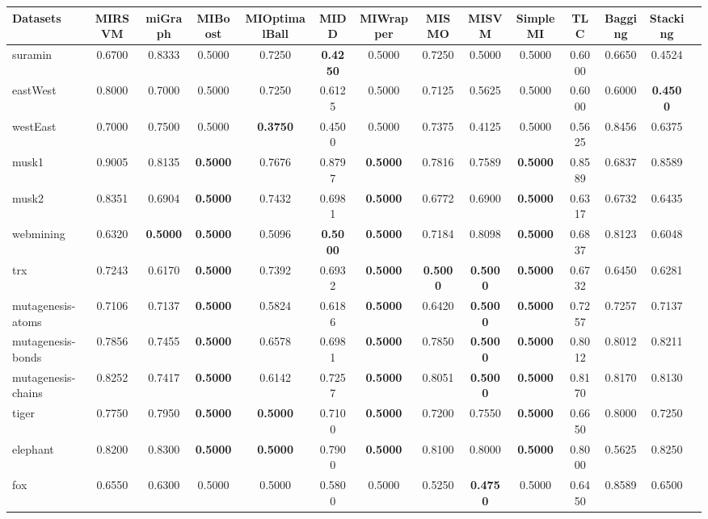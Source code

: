 \begin{threeparttable}
\begin{tabular}{lccccccccccccc}
\toprule
Datasets &MIRSVM &miGraph &MIBoost &MIOptimalBall &MIDD &MIWrapper &MISMO &MISVM &SimpleMI &TLC &Bagging &Stacking \\
\midrule
suramin &0.6700 &0.8333 &0.5000 &0.7250 &\textbf{0.4250} &0.5000 &0.7250 &0.5000 &0.5000 &0.6000 &0.6650 &0.4524 &  \\
eastWest &0.8000 &0.7000 &0.5000 &0.7250 &0.6125 &0.5000 &0.7125 &0.5625 &0.5000 &0.6000 &0.6000 &\textbf{0.4500} &  \\
westEast &0.7000 &0.7500 &0.5000 &\textbf{0.3750} &0.4500 &0.5000 &0.7375 &0.4125 &0.5000 &0.5625 &0.8456 &0.6375 &  \\
musk1 &0.9005 &0.8135 &\textbf{0.5000} &0.7676 &0.8797 &\textbf{0.5000} &0.7816 &0.7589 &\textbf{0.5000} &0.8589 &0.6837 &0.8589 &  \\
musk2 &0.8351 &0.6904 &\textbf{0.5000} &0.7432 &0.6981 &\textbf{0.5000} &0.6772 &0.6900 &\textbf{0.5000} &0.6317 &0.6732 &0.6435 &  \\
webmining &0.6320 &\textbf{0.5000} &\textbf{0.5000} &0.5096 &\textbf{0.5000} &\textbf{0.5000} &0.7184 &0.8098 &\textbf{0.5000} &0.6837 &0.8123 &0.6048 &  \\
trx &0.7243 &0.6170 &\textbf{0.5000} &0.7392 &0.6932 &\textbf{0.5000} &\textbf{0.5000} &\textbf{0.5000} &\textbf{0.5000} &0.6732 &0.6450 &0.6281 &  \\
mutagenesis-atoms &0.7106 &0.7137 &\textbf{0.5000} &0.5824 &0.6186 &\textbf{0.5000} &0.6420 &\textbf{0.5000} &\textbf{0.5000} &0.7257 &0.7257 &0.7137 &  \\
mutagenesis-bonds &0.7856 &0.7455 &\textbf{0.5000} &0.6578 &0.6981 &\textbf{0.5000} &0.7850 &\textbf{0.5000} &\textbf{0.5000} &0.8012 &0.8012 &0.8211 &  \\
mutagenesis-chains &0.8252 &0.7417 &\textbf{0.5000} &0.6142 &0.7257 &\textbf{0.5000} &0.8051 &\textbf{0.5000} &\textbf{0.5000} &0.8170 &0.8170 &0.8130 &  \\
tiger &0.7750 &0.7950 &\textbf{0.5000} &\textbf{0.5000} &0.7100 &\textbf{0.5000} &0.7200 &0.7550 &\textbf{0.5000} &0.6650 &0.8000 &0.7250 &  \\
elephant &0.8200 &0.8300 &\textbf{0.5000} &\textbf{0.5000} &0.7900 &\textbf{0.5000} &0.8100 &0.8000 &\textbf{0.5000} &0.8000 &0.5625 &0.8250 &  \\
fox &0.6550 &0.6300 &0.5000 &0.5000 &0.5800 &0.5000 &0.5250 &\textbf{0.4750} &0.5000 &0.6450 &0.8589 &0.6500 &  \\

\end{tabular}
\end{threeparttable}
